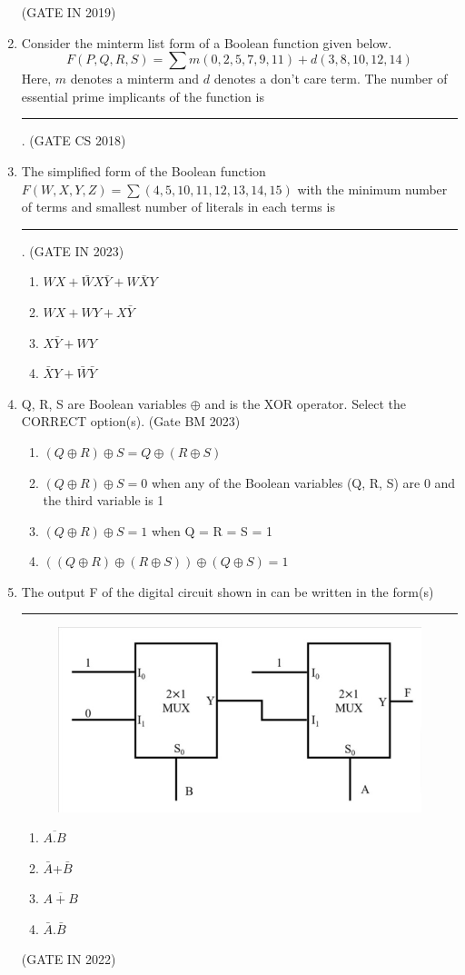 \begin{enumerate}[label=\arabic*.,ref=\theenumi]
\begin{enumerate}
      \end{enumerate}
\hfill(GATE IN 2019)
\fi
  \item 
  \label{prob:gate  CS 49 }
 Consider the minterm list form of a Boolean function given below.$$F(P, Q, R, S) = \sum m(0, 2, 5, 7, 9, 11) + d(3, 8, 10, 12, 14)$$
 Here, $m$ denotes a minterm and $d$ denotes a don’t care term. The number of essential prime implicants of the function is \rule{1cm}{0.1pt}.
\hfill (GATE CS 2018)
%
 \item The simplified form of the Boolean function $F(W,X,Y,Z)=\sum(4,5,10,11,12,13,14,15)$ with the minimum number of terms and smallest number of literals in each terms is \rule{1cm}{0.1pt}.
 \hfill{(GATE IN 2023)}
	  \begin{enumerate}
		  \item $WX+\bar WX\bar Y+W\bar XY$
		   \item $WX+WY+X\bar Y$
		     \item $X\bar Y+WY$
		      \item$\bar XY+\bar W\bar Y$
	\end{enumerate}
%
\item Q, R, S are Boolean variables  $ \oplus$ and is the XOR operator. Select the CORRECT option(s).
\hfill{(Gate BM 2023)}
\begin{enumerate}
\item $(Q  \oplus  R)  \oplus  S = Q  \oplus  (R  \oplus  S) $
\item $(Q  \oplus  R)  \oplus  S = 0$ when any of the Boolean variables (Q, R, S) are 0 and the third variable is 1
\item $(Q  \oplus  R)  \oplus  S = 1$ when Q = R = S = 1
\item $((Q  \oplus  R)  \oplus  (R  \oplus  S))  \oplus  (Q  \oplus  S) = 1$
\end{enumerate}
%
\item The output F of the digital circuit shown 
	in 
	can be written in the form(s)\rule{2cm}{0.5pt}
    \begin{figure}[H]
        \centering
        \includegraphics[width=0.75\columnwidth]{figs/gate_in_2022_q23.jpg}
        \caption{}
\label{fig:GATE IN 2022}
    \end{figure}
    \begin{enumerate}
        \item $\overline{A.B}$
        \item $\bar{A}$+$\bar{B}$
        \item $\overline{A + B}$
        \item $\bar{A}$.$\bar{B}$
    \end{enumerate}
    \hfill (GATE IN 2022)


\end{enumerate}
